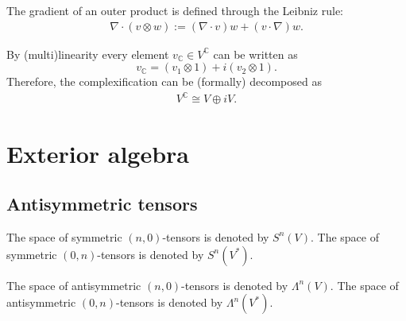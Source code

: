     \begin{property}
        The gradient of an outer product is defined through the Leibniz rule:
        \begin{gather}
            \nabla\cdot(v\otimes w) := (\nabla\cdot v)w+(v\cdot\nabla)w.
        \end{gather}
    \end{property}

    \begin{property}\label{vector:complexification_decomposition}
        By (multi)linearity every element $v_{\mathbb{C}}\in V^{\mathbb{C}}$ can be written as \[v_{\mathbb{C}} = (v_1\otimes1) + i(v_2\otimes 1).\] Therefore, the complexification can be (formally) decomposed as
        \begin{gather}
            V^{\mathbb{C}} \cong V\oplus iV.
        \end{gather}
    \end{property}

\section{Exterior algebra}
\subsection{Antisymmetric tensors}

    \begin{notation}
        The space of symmetric $(n,0)$-tensors is denoted by $S^n(V)$. The space of symmetric $(0,n)$-tensors is denoted by $S^n(V^*)$.
    \end{notation}
    \begin{notation}\label{vector:antysimmetric_space}
        The space of antisymmetric $(n,0)$-tensors is denoted by $\Lambda^n(V)$. The space of antisymmetric $(0,n)$-tensors is denoted by $\Lambda^n(V^*)$.
    \end{notation}

